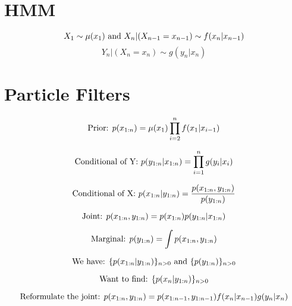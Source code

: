 \documentclass{article}
\begin{document}
\section{HMM}
\begin{equation}
X_1 \sim \mu (x_1) \textnormal{ and } X_n|(X_{n-1}=x_{n-1}) \sim f(x_n|x_{n-1})
\end{equation}
\begin{equation}
Y_n|(X_n = x_n) \sim g(y_n|x_n)
\end{equation}


\section{Particle Filters}
\begin{equation}
\textnormal{Prior: }
p(x_{1:n}) = \mu(x_1)\prod_{i=2}^{n} f(x_1|x_{i-1})
\end{equation}

\begin{equation}
\textnormal{Conditional of Y: }
p(y_{1:n}|x_{1:n}) = \prod_{i=1}^{n} g(y_i|x_i)
\end{equation}

\begin{equation}
\textnormal{Conditional of X: }
p(x_{1:n}|y_{1:n}) = \frac{p(x_{1:n},y_{1:n})}{p(y_{1:n})}
\end{equation}

\begin{equation}
\textnormal{Joint: }
p(x_{1:n},y_{1:n}) = p(x_{1:n}) p(y_{1:n}|x_{1:n})
\end{equation}

\begin{equation}
\textnormal{Marginal: }
p(y_{1:n}) = \int p(x_{1:n},y_{1:n})
\end{equation}

\begin{equation}
\textnormal{We have: }
\{p(x_{1:n}|y_{1:n})\}_{n>0}
\textnormal{ and }
\{p(y_{1:n})\}_{n>0}
\end{equation}

\begin{equation}
\textnormal{Want to find: }
\{p(x_n|y_{1:n})\}_{n>0}
\end{equation}

\begin{equation}
\textnormal{Reformulate the joint: }
p(x_{1:n},y_{1:n}) = p(x_{1:n-1},y_{1:n-1}) f(x_n|x_{n-1}) g(y_n|x_n)
\end{equation}
\end{document}

